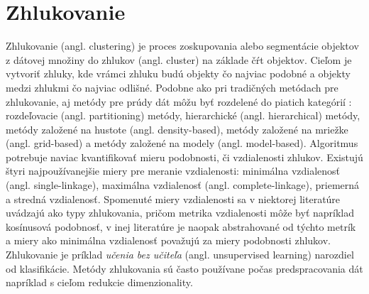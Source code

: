 

\section{Zhlukovanie}
Zhlukovanie (angl. clustering) je proces zoskupovania alebo segmentácie objektov z dátovej množiny do zhlukov (angl. cluster) na základe čŕt objektov. Cieľom je vytvoriť zhluky, kde vrámci zhluku budú objekty čo najviac podobné a objekty medzi zhlukmi čo najviac odlišné. Podobne ako pri tradičných metódach pre zhlukovanie, aj metódy pre prúdy dát môžu byť rozdelené do piatich kategórií \citep{nguyen2015survey, aggarwal2014survey}: rozdeľovacie (angl. partitioning) metódy, hierarchické (angl. hierarchical) metódy, metódy založené na hustote (angl. density-based), metódy založené na mriežke (angl. grid-based) a metódy založené na modely (angl. model-based). Algoritmus potrebuje naviac kvantifikovať mieru podobnosti, či vzdialenosti zhlukov. Existujú štyri najpoužívanejšie miery pre meranie vzdialenosti: minimálna vzdialenosť (angl. single-linkage), maximálna vzdialenosť (angl. complete-linkage), priemerná a stredná vzdialenosť. Spomenuté miery vzdialenosti sa v niektorej literatúre uvádzajú ako typy zhlukovania, pričom metrika vzdialenosti môže byť napríklad kosínusová podobnosť, v inej literatúre je naopak abstrahované od týchto metrík a miery ako minimálna vzdialenosť považujú za miery podobnosti zhlukov. Zhlukovanie je príklad \textit{učenia bez učiteľa} (angl. unsupervised learning) narozdiel od klasifikácie. Metódy zhlukovania sú často používane počas predspracovania dát napríklad s cieľom redukcie dimenzionality.

